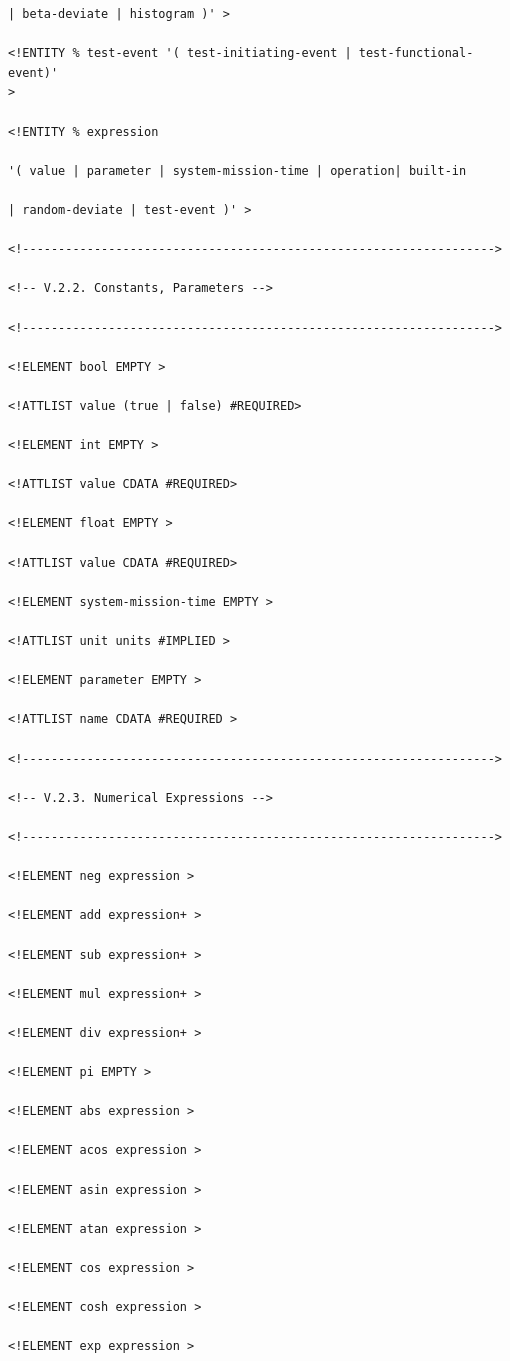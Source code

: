 \documentclass[11pt]{article}
\begin{document}
\begin{lstlisting}
| beta-deviate | histogram )' >

<!ENTITY % test-event '( test-initiating-event | test-functional-event)'
>

<!ENTITY % expression

'( value | parameter | system-mission-time | operation| built-in

| random-deviate | test-event )' >

<!------------------------------------------------------------------>

<!-- V.2.2. Constants, Parameters -->

<!------------------------------------------------------------------>

<!ELEMENT bool EMPTY >

<!ATTLIST value (true | false) #REQUIRED>

<!ELEMENT int EMPTY >

<!ATTLIST value CDATA #REQUIRED>

<!ELEMENT float EMPTY >

<!ATTLIST value CDATA #REQUIRED>

<!ELEMENT system-mission-time EMPTY >

<!ATTLIST unit units #IMPLIED >

<!ELEMENT parameter EMPTY >

<!ATTLIST name CDATA #REQUIRED >

<!------------------------------------------------------------------>

<!-- V.2.3. Numerical Expressions -->

<!------------------------------------------------------------------>

<!ELEMENT neg expression >

<!ELEMENT add expression+ >

<!ELEMENT sub expression+ >

<!ELEMENT mul expression+ >

<!ELEMENT div expression+ >

<!ELEMENT pi EMPTY >

<!ELEMENT abs expression >

<!ELEMENT acos expression >

<!ELEMENT asin expression >

<!ELEMENT atan expression >

<!ELEMENT cos expression >

<!ELEMENT cosh expression >

<!ELEMENT exp expression >


\end{lstlisting}
\end{document}
